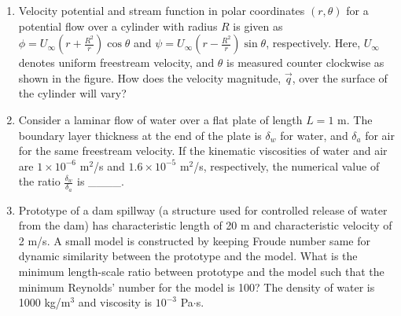 \documentclass[journal,12pt,onecolumn]{IEEEtran}
\theoremstyle{remark}
\begin{document}
\begin{enumerate}
\item Velocity potential and stream function in polar coordinates $(r, \theta)$ for a potential flow over a cylinder with radius $R$ is given as $\phi = U_\infty \left(r + \frac{R^2}{r}\right)\cos\theta$ and $\psi = U_\infty \left(r - \frac{R^2}{r}\right)\sin\theta$, respectively. Here, $U_\infty$ denotes uniform freestream velocity, and $\theta$ is measured counter clockwise as shown in the figure. How does the velocity magnitude, $\vec{q}$, over the surface of the cylinder will vary?

\begin{figure}[!ht]
	\centering
\end{figure}

\begin{enumerate}
\end{enumerate}

\item Consider a laminar flow of water over a flat plate of length $L = 1$ m. The boundary layer thickness at the end of the plate is $\delta_w$ for water, and $\delta_a$ for air for the same freestream velocity. If the kinematic viscosities of water and air are $1 \times 10^{-6}$ m$^2$/s and $1.6 \times 10^{-5}$ m$^2$/s, respectively, the numerical value of the ratio $\frac{\delta_w}{\delta_a}$ is \_\_\_\_.\\


\item Prototype of a dam spillway (a structure used for controlled release of water from the dam) has characteristic length of 20 m and characteristic velocity of 2 m/s. A small model is constructed by keeping Froude number same for dynamic similarity between the prototype and the model. What is the minimum length-scale ratio between prototype and the model such that the minimum Reynolds' number for the model is 100? The density of water is 1000 kg/m$^3$ and viscosity is $10^{-3}$ Pa$\cdot$s.


\end{enumerate}
\end{document}
